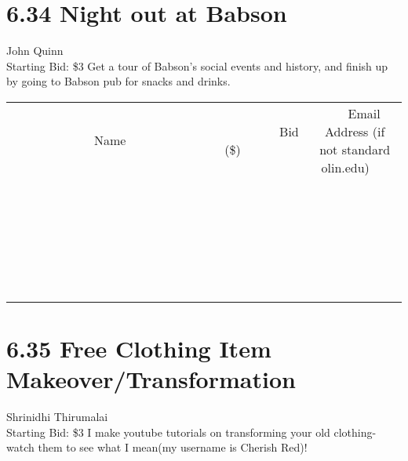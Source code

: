 \documentclass[11pt]{article}
\begin{document}
\section*{6.34 Night out at Babson}
John Quinn
\\
Starting Bid: \$3
\newline
Get a tour of Babson's social events and history, and finish up by going to Babson pub for snacks and drinks.
\\[6ex]
\begin{tabular}{c c c}
~~~~~~~~~~~~~Name~~~~~~~~~~~~~ & ~~~~~~~~~Bid (\$)~~~~~~~~~  & ~~~Email Address (if not standard olin.edu)~~~\\
 & & \\
\hline
 & & \\
\hline
 & & \\
\hline
 & & \\
\hline
 & & \\
\hline
 & & \\
\hline
 & & \\
\hline
 & & \\
\hline
 & & \\
\hline
 & & \\
\hline
 & & \\
\hline
 & & \\
\hline
 & & \\
\hline
 & & \\
\hline
 & & \\
\hline
 & & \\
\hline
 & & \\
\hline
 & & \\
\hline
 & & \\
\hline
 & & \\
\hline
 & & \\
\hline
 & & \\
\hline
 & & \\
\hline
 & & \\
\hline
 & & \\
\hline
 & & \\
\hline
\end{tabular}
\newpage
\section*{6.35 Free Clothing Item Makeover/Transformation}
Shrinidhi Thirumalai
\\
Starting Bid: \$3
\newline
I make youtube tutorials on transforming your old clothing- watch them to see what I mean(my username is Cherish Red)! 
\end{document}
